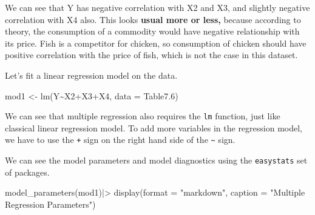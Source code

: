 \documentclass[
  letterpaper,
  paper =a4,
  twoside,
  openright,
  headsepline,
  footsepline,
  listof = totocnumbered,
  chapterprefix = true,
  firstiscover,
  parskip = full*]{scrbook}
\newenvironment{Shaded}{\begin{snugshade}}{\end{snugshade}}
\newcommand{\AttributeTok}[1]{\textcolor[rgb]{0.40,0.45,0.13}{#1}}
\newcommand{\FloatTok}[1]{\textcolor[rgb]{0.68,0.00,0.00}{#1}}
\newcommand{\FunctionTok}[1]{\textcolor[rgb]{0.28,0.35,0.67}{#1}}
\newcommand{\NormalTok}[1]{\textcolor[rgb]{0.00,0.23,0.31}{#1}}
\newcommand{\OtherTok}[1]{\textcolor[rgb]{0.00,0.23,0.31}{#1}}
\newcommand{\SpecialCharTok}[1]{\textcolor[rgb]{0.37,0.37,0.37}{#1}}
\newcommand{\StringTok}[1]{\textcolor[rgb]{0.13,0.47,0.30}{#1}}
\begin{document}
We can see that Y has negative correlation with X2 and X3, and slightly
negative correlation with X4 also. This looks \textbf{usual more or
less,} because according to theory, the consumption of a commodity would
have negative relationship with its price. Fish is a competitor for
chicken, so consumption of chicken should have positive correlation with
the price of fish, which is not the case in this dataset.

Let's fit a linear regression model on the data.

\begin{Shaded}
\begin{Highlighting}[]
\NormalTok{mod1 }\OtherTok{\textless{}{-}} \FunctionTok{lm}\NormalTok{(Y}\SpecialCharTok{\textasciitilde{}}\NormalTok{X2}\SpecialCharTok{+}\NormalTok{X3}\SpecialCharTok{+}\NormalTok{X4, }\AttributeTok{data =}\NormalTok{ Table7}\FloatTok{.6}\NormalTok{)}
\end{Highlighting}
\end{Shaded}

We can see that multiple regression also requires the \texttt{lm}
function, just like classical linear regression model. To add more
variables in the regression model, we have to use the \texttt{+} sign on
the right hand side of the \texttt{\textasciitilde{}} sign.

We can see the model parameters and model diagnostics using the
\texttt{easystats} set of packages.

\begin{Shaded}
\begin{Highlighting}[]
\FunctionTok{model\_parameters}\NormalTok{(mod1)}\SpecialCharTok{|\textgreater{}} 
  \FunctionTok{display}\NormalTok{(}\AttributeTok{format =} \StringTok{"markdown"}\NormalTok{, }\AttributeTok{caption =} \StringTok{"Multiple Regression Parameters"}\NormalTok{)}
\end{Highlighting}
\end{Shaded}
\end{document}
